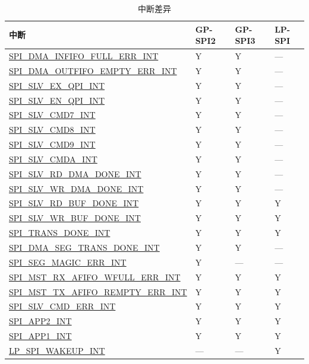 \documentclass[main\_\_CN.tex]{subfiles}
\begin{document}
\begin{longtable}{|p{7.5cm}|p{1.5cm}|p{1.5cm}|p{1.5cm}|}
\caption{中断差异}\label{tab:interrupt-differences}
\\
\hline
\rowcolor{lightgray}   
\textbf{中断} & \textbf{GP-SPI2} & \textbf{GP-SPI3}  & \textbf{LP-SPI} \\ \hline
\endhead
\hyperref[int:SPIINFIFOFULLERRINT]{SPI\_DMA\_INFIFO\_FULL\_ERR\_INT} &  Y  &  Y & ---  \\ \hline
\hyperref[int:SPIOUTFIFOEMPTYERRINT]{SPI\_DMA\_OUTFIFO\_EMPTY\_ERR\_INT} & Y &  Y & --- \\ \hline
\hyperref[int:SPISLVEXQPIINT]{SPI\_SLV\_EX\_QPI\_INT}& Y & Y & ---\\ \hline
\hyperref[int:SPISLVENQPIINT]{SPI\_SLV\_EN\_QPI\_INT} & Y & Y & --- \\ \hline
\hyperref[int:SPISLVCMD7INT]{SPI\_SLV\_CMD7\_INT} & Y & Y & ---\\ \hline
\hyperref[int:SPISLVCMD8INT]{SPI\_SLV\_CMD8\_INT}& Y & Y & ---\\ \hline
\hyperref[int:SPISLVCMD9INT]{SPI\_SLV\_CMD9\_INT} & Y & Y & --- \\ \hline
\hyperref[int:SPISLVCMDAINT]{SPI\_SLV\_CMDA\_INT} & Y & Y & --- \\ \hline
\hyperref[int:SPISLVRDDMADONEINT]{SPI\_SLV\_RD\_DMA\_DONE\_INT} & Y & Y & --- \\ \hline
\hyperref[int:SPISLVWRDMADONEINT]{SPI\_SLV\_WR\_DMA\_DONE\_INT} & Y & Y & ---\\ \hline
\hyperref[int:SPISLVRDBUFDONEINT]{SPI\_SLV\_RD\_BUF\_DONE\_INT} & Y & Y & Y \\ \hline
\hyperref[int:SPISLVWRBUFDONEINT]{SPI\_SLV\_WR\_BUF\_DONE\_INT} & Y & Y & Y \\ \hline
\hyperref[int:SPITRANSDONEINT]{SPI\_TRANS\_DONE\_INT} & Y & Y & Y \\ \hline
\hyperref[int:SPIDMASEGTRANSDONEINT]{SPI\_DMA\_SEG\_TRANS\_DONE\_INT} & Y & Y & ---\\ \hline
\hyperref[int:SPISEGMAGICERRINT]{SPI\_SEG\_MAGIC\_ERR\_INT} & Y & --- & --- \\ \hline
\hyperref[int:SPIMSTRXAFIFOWFULLERRINT]{SPI\_MST\_RX\_AFIFO\_WFULL\_ERR\_INT} & Y & Y & Y\\ \hline
\hyperref[int:SPIMSTTXAFIFOREMPTYERRINT]{SPI\_MST\_TX\_AFIFO\_REMPTY\_ERR\_INT} & Y & Y & Y\\ \hline
\hyperref[int:SPISLVCMDERRINT]{SPI\_SLV\_CMD\_ERR\_INT} & Y & Y & Y\\ \hline
\hyperref[int:SPIAPP2INT]{SPI\_APP2\_INT} & Y & Y & Y\\ \hline
\hyperref[int:SPIAPP1INT]{SPI\_APP1\_INT} & Y & Y & Y\\ \hline
\hyperref[int:LPSPIWAKEUPINT]{LP\_SPI\_WAKEUP\_INT} & --- & --- & Y \\ \hline
\end{longtable}
\end{document}
